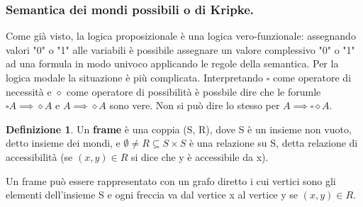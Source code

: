 \documentclass{article}
\theoremstyle{definition}
\newtheorem{definizione}{Definizione}
\theoremstyle{plain}
\theoremstyle{plain}
\theoremstyle{plain}
\theoremstyle{plain}
\begin{document}
\subsubsection*{Semantica dei mondi possibili o di Kripke.}
Come già visto, la logica proposizionale è una logica vero-funzionale: assegnando valori "0" o "1" alle variabili è possibile assegnare un valore complessivo "0" o "1" ad una formula in modo univoco applicando le regole della semantica. \newline
Per la logica modale la situazione è più complicata. Interpretando $\square$ come operatore di necessità e $\diamond$ come operatore di possibilità è possbile dire che le forumle $\square A \implies \diamond A$ e $A \implies \diamond A$ sono vere. Non si può dire lo stesso per $A \implies \square \diamond A$.

\begin{definizione}
    Un \textbf{frame} è una coppia (S, R), dove S è un insieme non vuoto, detto insieme dei mondi, e $\emptyset \ne R \subseteq S \times S$ è una relazione su S, detta relazione di accessibilità (se $(x, y) \in R$ si dice che y è accessibile da x). 
\end{definizione}
Un frame può essere rappresentato con un grafo diretto i cui vertici sono gli elementi dell'insieme S e ogni freccia va dal vertice x al vertice y se $(x, y) \in R$. 
\end{document}
